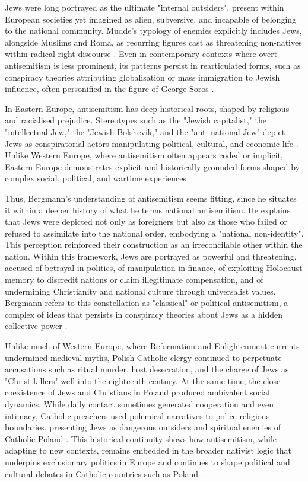 Jews were long portrayed as the ultimate "internal outsiders", present within European societies yet imagined as alien, subversive, and incapable of belonging to the national community. Mudde's typology of enemies explicitly includes Jews, alongside Muslims and Roma, as recurring figures cast as threatening non-natives within radical right discourse \citep{mudde_populist_2007}. Even in contemporary contexts where overt antisemitism is less prominent, its patterns persist in rearticulated forms, such as conspiracy theories attributing globalisation or mass immigration to Jewish influence, often personified in the figure of George Soros \citep{demata_anti-sorosism_2022}.

In Eastern Europe, antisemitism has deep historical roots, shaped by religious and racialised prejudice. Stereotypes such as the "Jewish capitalist," the "intellectual Jew," the "Jewish Bolshevik," and the "anti-national Jew" depict Jews as conspiratorial actors manipulating political, cultural, and economic life . Unlike Western Europe, where antisemitism often appears coded or implicit, Eastern Europe demonstrates explicit and historically grounded forms shaped by complex social, political, and wartime experiences \citep{wodak__2017}.

Thus, Bergmann's understanding of antisemitism seems fitting, since he situates it within a deeper history of what he terms national antisemitism. He explains that Jews were depicted not only as foreigners but also as those who failed or refused to assimilate into the national order, embodying a "national non-identity". This perception reinforced their construction as an irreconcilable other within the nation. Within this framework, Jews are portrayed as powerful and threatening, accused of betrayal in politics, of manipulation in finance, of exploiting Holocaust memory to discredit nations or claim illegitimate compensation, and of undermining Christianity and national culture through universalist values. Bergmann refers to this constellation as "classical" or political antisemitism, a complex of ideas that persists in conspiracy theories about Jews as a hidden collective power \citep{bergmann_antisemitism_2013}.

Unlike much of Western Europe, where Reformation and Enlightenment currents undermined medieval myths, Polish Catholic clergy continued to perpetuate accusations such as ritual murder, host desecration, and the charge of Jews as "Christ killers" well into the eighteenth century. At the same time, the close coexistence of Jews and Christians in Poland produced ambivalent social dynamics. While daily contact sometimes generated cooperation and even intimacy, Catholic preachers used polemical narratives to police religious boundaries, presenting Jews as dangerous outsiders and spiritual enemies of Catholic Poland \citep{teter_jews_2005}. This historical continuity shows how antisemitism, while adapting to new contexts, remains embedded in the broader nativist logic that underpins exclusionary politics in Europe and continues to shape political and cultural debates in Catholic countries such as Poland \citep{bergmann_antisemitism_2013}.

